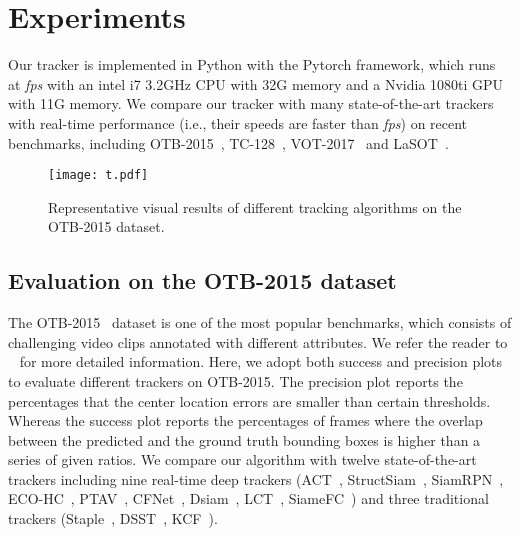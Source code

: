 \documentclass[10pt,twocolumn,letterpaper]{article}
\begin{document}
\vspace{-1.5mm}
\section{Experiments}
Our tracker is implemented in Python with the Pytorch framework, which runs at \emph{fps}
with an intel i7 3.2GHz CPU with 32G memory and a Nvidia 1080ti GPU with 11G memory.
We compare our tracker with many state-of-the-art trackers with real-time performance
(i.e., their speeds are faster than \emph{fps}) on recent benchmarks,
including OTB-2015~\cite{WuLY-15paim-OTB100}, TC-128~\cite{TC128},
VOT-2017~\cite{KristanLMFPCVHL-ICCVW17-VOT17} and LaSOT~\cite{LaSOT}.


\begin{figure*}[t]
	\footnotesize
	\begin{center}
		\texttt{[image: t.pdf]}   \\
	\end{center}
 	\vspace{-3mm}
	\caption{Representative visual results of different tracking algorithms on the OTB-2015 dataset.}
	\label{fig-visual}
\end{figure*}






\subsection{Evaluation on the OTB-2015 dataset}
The OTB-2015~\cite{WuLY-15paim-OTB100} dataset is one of the most popular
benchmarks, which consists of  challenging video clips annotated with 
different attributes. We refer the reader to ~\cite{WuLY-15paim-OTB100} for more detailed information.
Here, we adopt both
success and precision plots to evaluate different trackers on OTB-2015.
The precision plot reports the percentages that the center location errors
are smaller than certain thresholds. Whereas the success plot reports the
percentages of frames where the overlap between the predicted and the
ground truth bounding boxes is higher than a series of given ratios.
We compare our algorithm with twelve state-of-the-art trackers including nine
real-time deep trackers (ACT~\cite{chen-ECCV18-act},
StructSiam~\cite{zhang-eccv2018-structsiam}, SiamRPN~\cite{Li-2018CVPR-siameserpn},
ECO-HC~\cite{Martin-ECO-CVPR17}, PTAV~\cite{ptav-iccv17},
CFNet~\cite{cfnet-cvpr17}, Dsiam~\cite{Guo-dsiam-iccv2017}, LCT~\cite{LCT15},
SiameFC~\cite{Bertinetto-ECCV16-SiamesFC}) and three traditional trackers
(Staple~\cite{staple16}, DSST~\cite{Danelljan-BMVC14-DSST},
KCF~\cite{Henriques-TPAMI15-KCF}).
\end{document}
